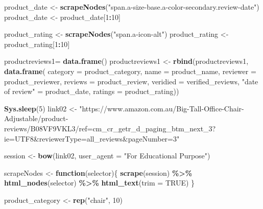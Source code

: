 \documentclass[
]{article}
\newenvironment{Shaded}{\begin{snugshade}}{\end{snugshade}}
\newcommand{\AttributeTok}[1]{\textcolor[rgb]{0.13,0.29,0.53}{#1}}
\newcommand{\ConstantTok}[1]{\textcolor[rgb]{0.56,0.35,0.01}{#1}}
\newcommand{\ControlFlowTok}[1]{\textcolor[rgb]{0.13,0.29,0.53}{\textbf{#1}}}
\newcommand{\DecValTok}[1]{\textcolor[rgb]{0.00,0.00,0.81}{#1}}
\newcommand{\FunctionTok}[1]{\textcolor[rgb]{0.13,0.29,0.53}{\textbf{#1}}}
\newcommand{\NormalTok}[1]{#1}
\newcommand{\OtherTok}[1]{\textcolor[rgb]{0.56,0.35,0.01}{#1}}
\newcommand{\SpecialCharTok}[1]{\textcolor[rgb]{0.81,0.36,0.00}{\textbf{#1}}}
\newcommand{\StringTok}[1]{\textcolor[rgb]{0.31,0.60,0.02}{#1}}
\begin{document}
\begin{Shaded}
\begin{Highlighting}[]
\NormalTok{  product\_date }\OtherTok{\textless{}{-}} \FunctionTok{scrapeNodes}\NormalTok{(}\StringTok{"span.a{-}size{-}base.a{-}color{-}secondary.review{-}date"}\NormalTok{)}
\NormalTok{  product\_date }\OtherTok{\textless{}{-}}\NormalTok{ product\_date[}\DecValTok{1}\SpecialCharTok{:}\DecValTok{10}\NormalTok{]}
  
\NormalTok{  product\_rating }\OtherTok{\textless{}{-}} \FunctionTok{scrapeNodes}\NormalTok{(}\StringTok{"span.a{-}icon{-}alt"}\NormalTok{)}
\NormalTok{  product\_rating }\OtherTok{\textless{}{-}}\NormalTok{ product\_rating[}\DecValTok{1}\SpecialCharTok{:}\DecValTok{10}\NormalTok{]}
  
\NormalTok{  productreviews1}\OtherTok{=} \FunctionTok{data.frame}\NormalTok{()}
\NormalTok{  productreviews1 }\OtherTok{\textless{}{-}} \FunctionTok{rbind}\NormalTok{(productreviews1, }\FunctionTok{data.frame}\NormalTok{(}
                      \AttributeTok{category =}\NormalTok{ product\_category,}
                      \AttributeTok{name =}\NormalTok{ product\_name,}
                      \AttributeTok{reviewer =}\NormalTok{ product\_reviewer,}
                      \AttributeTok{reviews =}\NormalTok{ product\_review,}
                      \AttributeTok{veridied =}\NormalTok{ verified\_reviews,}
                      \StringTok{"date of review"} \OtherTok{=}\NormalTok{ product\_date,}
                      \AttributeTok{ratings =}\NormalTok{ product\_rating))}

  
 \FunctionTok{Sys.sleep}\NormalTok{(}\DecValTok{5}\NormalTok{)}
\NormalTok{link02 }\OtherTok{\textless{}{-}} \StringTok{"https://www.amazon.com.au/Big{-}Tall{-}Office{-}Chair{-}Adjustable/product{-}reviews/B08VF9VKL3/ref=cm\_cr\_getr\_d\_paging\_btm\_next\_3?ie=UTF8\&reviewerType=all\_reviews\&pageNumber=3"}


\NormalTok{  session }\OtherTok{\textless{}{-}} \FunctionTok{bow}\NormalTok{(link02,}
               \AttributeTok{user\_agent =} \StringTok{"For Educational Purpose"}\NormalTok{)}

\NormalTok{  scrapeNodes }\OtherTok{\textless{}{-}} \ControlFlowTok{function}\NormalTok{(selector)\{}
    \FunctionTok{scrape}\NormalTok{(session) }\SpecialCharTok{\%\textgreater{}\%}
      \FunctionTok{html\_nodes}\NormalTok{(selector) }\SpecialCharTok{\%\textgreater{}\%}
      \FunctionTok{html\_text}\NormalTok{(}\AttributeTok{trim =} \ConstantTok{TRUE}\NormalTok{)}
\NormalTok{  \}}

\NormalTok{  product\_category }\OtherTok{\textless{}{-}} \FunctionTok{rep}\NormalTok{(}\StringTok{"chair"}\NormalTok{, }\DecValTok{10}\NormalTok{)}


\end{Highlighting}
\end{Shaded}
\end{document}
